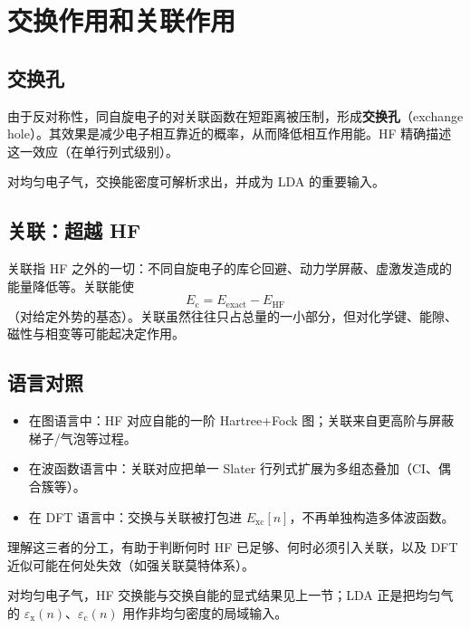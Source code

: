 \section{交换作用和关联作用}

\subsection{交换孔}

由于反对称性，同自旋电子的对关联函数在短距离被压制，形成\textbf{交换孔}（exchange hole）。其效果是减少电子相互靠近的概率，从而降低相互作用能。HF 精确描述这一效应（在单行列式级别）。

对均匀电子气，交换能密度可解析求出，并成为 LDA 的重要输入。

\subsection{关联：超越 HF}

关联指 HF 之外的一切：不同自旋电子的库仑回避、动力学屏蔽、虚激发造成的能量降低等。关联能使
\begin{equation}
  E_{\mathrm{c}}=E_{\mathrm{exact}}-E_{\mathrm{HF}}
\end{equation}
（对给定外势的基态）。关联虽然往往只占总量的一小部分，但对化学键、能隙、磁性与相变等可能起决定作用。

\subsection{语言对照}

\begin{itemize}
  \item 在图语言中：HF 对应自能的一阶 Hartree+Fock 图；关联来自更高阶与屏蔽梯子/气泡等过程。
  \item 在波函数语言中：关联对应把单一 Slater 行列式扩展为多组态叠加（CI、偶合簇等）。
  \item 在 DFT 语言中：交换与关联被打包进 $E_{\mathrm{xc}}[n]$，不再单独构造多体波函数。
\end{itemize}

理解这三者的分工，有助于判断何时 HF 已足够、何时必须引入关联，以及 DFT 近似可能在何处失效（如强关联莫特体系）。

对均匀电子气，HF 交换能与交换自能的显式结果见上一节；LDA 正是把均匀气的 $\varepsilon_{\mathrm{x}}(n)$、$\varepsilon_{\mathrm{c}}(n)$ 用作非均匀密度的局域输入。
